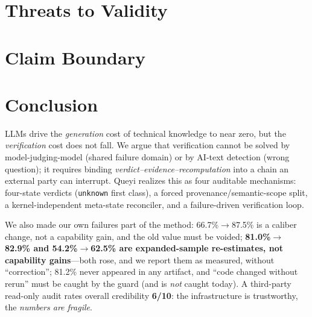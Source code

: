 \documentclass{article}
\begin{document}
\section{Threats to Validity}
\label{sec:validity}

\section{Claim Boundary}
\label{sec:claim}

\section{Conclusion}
\label{sec:conclusion}
LLMs drive the \emph{generation} cost of technical knowledge to near zero, but the
\emph{verification} cost does not fall. We argue that verification cannot be solved by
model-judging-model (shared failure domain) or by AI-text detection (wrong question); it requires
binding \emph{verdict--evidence--recomputation} into a chain an external party can interrupt.
Queyi realizes this as four auditable mechanisms: four-state verdicts (\texttt{unknown} first
class), a forced provenance/semantic-scope split, a kernel-independent meta-state reconciler, and
a failure-driven verification loop.

We also made our own failures part of the method: 66.7\%$\to$87.5\% is a caliber change, not a
capability gain, and the old value must be voided; \textbf{81.0\%$\to$82.9\% and
54.2\%$\to$62.5\% are expanded-sample re-estimates, not capability gains}---both rose, and we
report them as measured, without ``correction''; 81.2\% never appeared in any artifact, and ``code
changed without rerun'' must be caught by the guard (and is \emph{not} caught today). A third-party
read-only audit rates overall credibility \textbf{6/10}: the infrastructure is trustworthy, the
\emph{numbers are fragile}.
\end{document}
